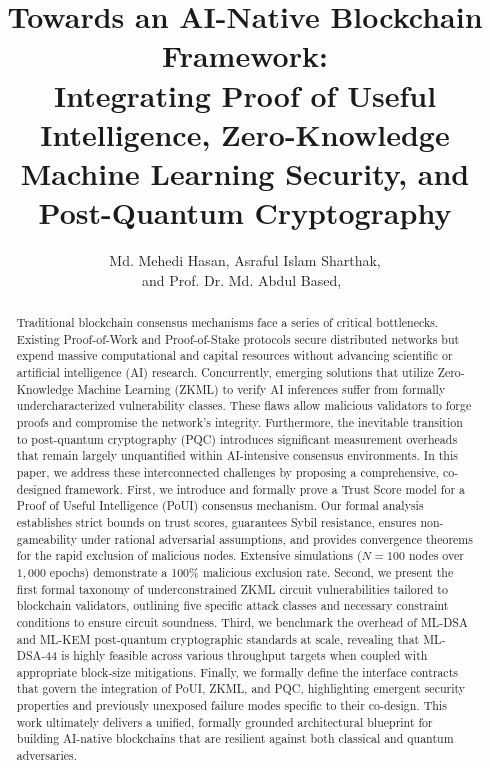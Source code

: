 \documentclass[journal]{IEEEtran}
\title{Towards an AI-Native Blockchain Framework:\\
Integrating Proof of Useful Intelligence, Zero-Knowledge\\
Machine Learning Security, and Post-Quantum Cryptography}
\author{Md. Mehedi Hasan, Asraful Islam Sharthak, \\
and Prof. Dr. Md. Abdul Based,~\IEEEmembership{Principal Investigator}
\IEEEcompsocitemizethanks{
  \IEEEcompsocthanksitem Manuscript submitted to IEEE Transactions on Dependable
  and Secure Computing (TDSC). \hfil\break
  \IEEEcompsocthanksitem Corresponding author: Md. Mehedi Hasan.
}}
\begin{document}
\maketitle

\begin{abstract}
Traditional blockchain consensus mechanisms face a series of critical bottlenecks. Existing Proof-of-Work and Proof-of-Stake protocols secure distributed networks but expend massive computational and capital resources without advancing scientific or artificial intelligence (AI) research. Concurrently, emerging solutions that utilize Zero-Knowledge Machine Learning (ZKML) to verify AI inferences suffer from formally undercharacterized vulnerability classes. These flaws allow malicious validators to forge proofs and compromise the network's integrity. Furthermore, the inevitable transition to post-quantum cryptography (PQC) introduces significant measurement overheads that remain largely unquantified within AI-intensive consensus environments. In this paper, we address these interconnected challenges by proposing a comprehensive, co-designed framework. First, we introduce and formally prove a Trust Score model for a Proof of Useful Intelligence (PoUI) consensus mechanism. Our formal analysis establishes strict bounds on trust scores, guarantees Sybil resistance, ensures non-gameability under rational adversarial assumptions, and provides convergence theorems for the rapid exclusion of malicious nodes. Extensive simulations ($N=100$ nodes over $1{,}000$ epochs) demonstrate a 100\% malicious exclusion rate. Second, we present the first formal taxonomy of underconstrained ZKML circuit vulnerabilities tailored to blockchain validators, outlining five specific attack classes and necessary constraint conditions to ensure circuit soundness. Third, we benchmark the overhead of ML-DSA and ML-KEM post-quantum cryptographic standards at scale, revealing that ML-DSA-44 is highly feasible across various throughput targets when coupled with appropriate block-size mitigations. Finally, we formally define the interface contracts that govern the integration of PoUI, ZKML, and PQC, highlighting emergent security properties and previously unexposed failure modes specific to their co-design. This work ultimately delivers a unified, formally grounded architectural blueprint for building AI-native blockchains that are resilient against both classical and quantum adversaries.
\end{abstract}
\end{document}
